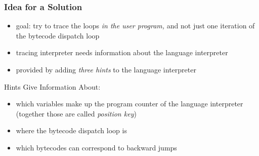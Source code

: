 \documentclass[utf8x]{beamer}
\begin{document}
\begin{frame}
    \frametitle{Idea for a Solution}
    \begin{itemize}
    \item goal: try to trace the loops \emph{in the user program,}
          and not just one iteration of the bytecode dispatch loop
    \item tracing interpreter needs information about the language interpreter
    \item provided by adding \emph{three hints} to the language interpreter
    \end{itemize}
    \pause
    \begin{block}{Hints Give Information About:}
    \begin{itemize}
    \item which variables make up the program counter of the language interpreter (together those are called \emph{position key})
    \item where the bytecode dispatch loop is
    \item which bytecodes can correspond to backward jumps
    \end{itemize}
    \end{block}
\end{frame}

\end{document}
